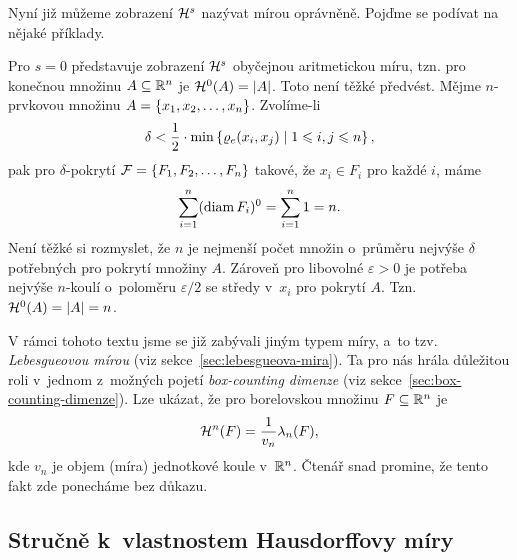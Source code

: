 Nyní již můžeme zobrazení $\mathcal{H}^{s}$ nazývat mírou oprávněně. Pojďme se podívat na nějaké příklady.
\begin{example}
    Pro $s=0$ představuje zobrazení $\mathcal{H}^{s}$ obyčejnou aritmetickou míru, tzn. pro konečnou množinu $A\subseteq\mathbb{R}^n$ je $\mathcal{H}^{0}(A)=|A|$. Toto není těžké předvést. Mějme $n$-prvkovou množinu $A=\left\{x_1,x_2,\ldots,x_n\right\}$. Zvolíme-li
    \[\delta<\dfrac{1}{2}\cdot\min\left\{\varrho_e(x_i,x_j)\mid 1\leqslant i,j\leqslant n\right\},\]
    pak pro $\delta$-pokrytí $\mathcal{F}=\left\{F_1,F_2,\ldots,F_n\right\}$ takové, že $x_i\in F_i$ pro každé $i$, máme
    \[\sum_{i=1}^{n}(\operatorname{diam}{F_i})^0=\sum_{i=1}^{n}1=n.\]
    Není těžké si rozmyslet, že $n$ je nejmenší počet množin o~průměru nejvýše $\delta$ potřebných pro pokrytí množiny $A$. Zároveň pro libovolné $\varepsilon>0$ je potřeba nejvýše $n$-koulí o~poloměru $\varepsilon/2$ se středy v~$x_i$ pro pokrytí $A$. Tzn.~$\mathcal{H}^{0}(A)=|A|=n$.
\end{example}

V rámci tohoto textu jsme se již zabývali jiným typem míry, a~to tzv. \emph{Lebesgueovou mírou} (viz sekce~\ref{sec:lebesgueova-mira}). Ta pro nás hrála důležitou roli v~jednom z~možných pojetí \emph{box-counting dimenze} (viz sekce~\ref{sec:box-counting-dimenze}). Lze ukázat, že pro borelovskou množinu $F\subseteq\mathbb{R}^n$ je
\[\mathcal{H}^{n}(F)=\dfrac{1}{v_n}\lambda_n(F),\]
kde $v_n$ je objem (míra) jednotkové koule v~$\mathbb{R}^n$. Čtenář snad promine, že tento fakt zde ponecháme bez důkazu. \citep[str. 45]{Falconer2014}

\subsection{Stručně k~vlastnostem Hausdorffovy míry}\label{subsec:vlastnosti-hausdorffovy-miry}

